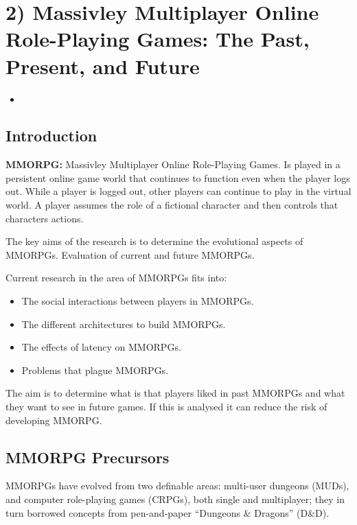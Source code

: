 \chapter*{2) Massivley Multiplayer Online Role-Playing Games: The Past, Present, and Future}

  \begin{itemize}
    \item 
  \end{itemize}

  \section*{Introduction}
  {\bf MMORPG:} Massivley Multiplayer Online Role-Playing Games. Is played in a persistent online game world that continues to function even when the player logs out. While a player is logged out, other players can continue to play in the virtual world. A player assumes the role of a fictional character and then controls that characters actions. 

  The key aims of the research is to determine the evolutional aspects of MMORPGs. Evaluation of current and future MMORPGs. 

  Current research in the area of MMORPGs fits into:
  \begin{itemize}
    \item The social interactions between players in MMORPGs. 
    \item The different architectures to build MMORPGs. 
    \item The effects of latency on MMORPGs.
    \item Problems that plague MMORPGs. 
  \end{itemize}

  The aim is to determine what is that players liked in past MMORPGs and what they want to see in future games. If this is analysed it can reduce the risk of developing MMORPG. 

  \section*{MMORPG Precursors}
  MMORPGs have evolved from two definable areas: multi-user dungeons (MUDs), and computer role-playing games (CRPGs), both single and multiplayer; they in turn borrowed concepts from pen-and-paper ``Dungeons \& Dragons'' (D\&D).

